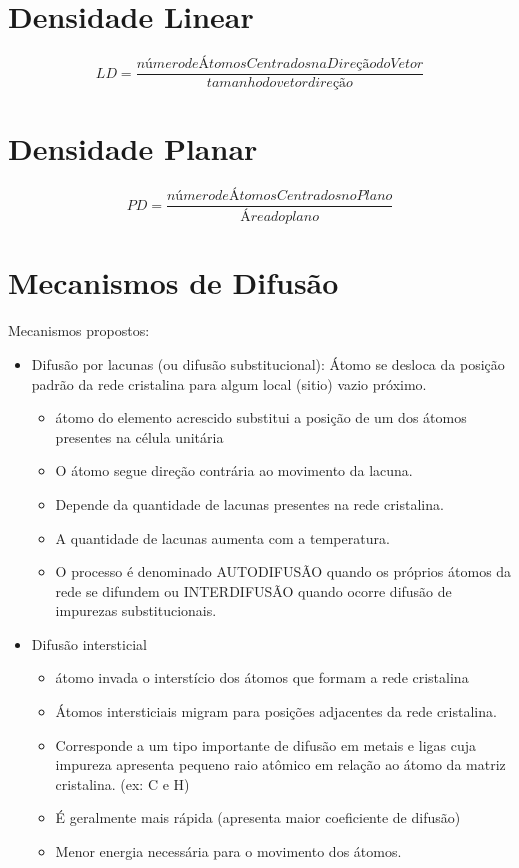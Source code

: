 \section{Densidade Linear}

\begin{equation}\label{key}
LD = \frac{número de Átomos Centrados na Direção do Vetor}{tamanho do vetor direção}
\end{equation}


\section{Densidade Planar}

\begin{equation}\label{key}
PD = \dfrac{número de Átomos Centrados no Plano}{Área do plano}
\end{equation}




\section{Mecanismos de Difusão}


Mecanismos propostos:




\begin{itemize}
	\item Difusão por lacunas (ou difusão substitucional): Átomo se desloca da posição padrão da rede cristalina para algum local (sitio) vazio próximo.
	\begin{itemize}
		\item átomo do elemento acrescido substitui a posição de um dos átomos presentes na célula unitária
		\item O átomo segue direção contrária ao movimento da lacuna.
		\item Depende da quantidade de lacunas presentes na rede cristalina.
		\item A quantidade de lacunas aumenta com a temperatura.
		\item O processo é denominado AUTODIFUSÃO quando os próprios átomos da rede se difundem ou INTERDIFUSÃO quando ocorre difusão de impurezas substitucionais.
	\end{itemize}
	\item Difusão intersticial
	\begin{itemize}
		\item átomo invada o interstício dos átomos que formam a rede cristalina
		\item Átomos intersticiais migram para posições adjacentes da rede cristalina.
		\item Corresponde a um tipo importante de difusão em metais e ligas cuja impureza apresenta pequeno raio atômico em relação ao átomo da matriz cristalina. (ex: C e H)
		\item É geralmente mais rápida (apresenta maior coeficiente de difusão)
		\item Menor energia necessária para o movimento dos átomos.
	\end{itemize}
\end{itemize}



